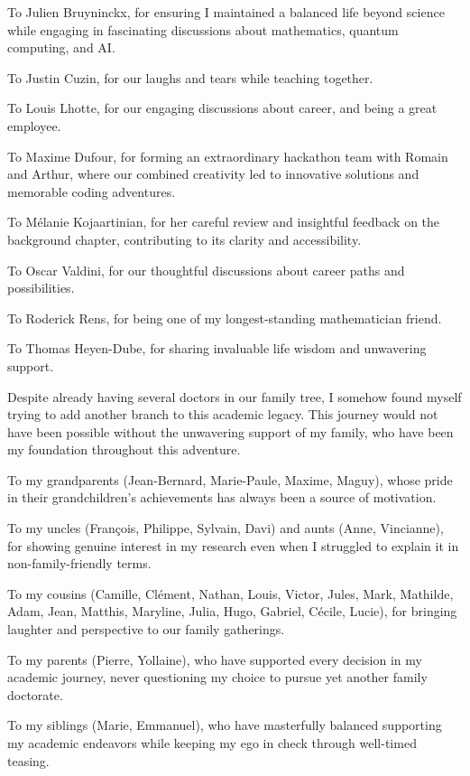 To Julien Bruyninckx, for ensuring I maintained a balanced life beyond science while engaging in fascinating discussions about mathematics, quantum computing, and AI.

To Justin Cuzin, for our laughs and tears while teaching together.

To Louis Lhotte, for our engaging discussions about career, and being a great employee.

To Maxime Dufour, for forming an extraordinary hackathon team with Romain and Arthur, where our combined creativity led to innovative solutions and memorable coding adventures.

To Mélanie Kojaartinian, for her careful review and insightful feedback on the background chapter, contributing to its clarity and accessibility.

To Oscar Valdini, for our thoughtful discussions about career paths and possibilities.

To Roderick Rens, for being one of my longest-standing mathematician friend.

To Thomas Heyen-Dube, for sharing invaluable life wisdom and unwavering support.



Despite already having several doctors in our family tree, I somehow found myself trying to add another branch to this academic legacy.
This journey would not have been possible without the unwavering support of my family, who have been my foundation throughout this adventure.

To my grandparents (Jean-Bernard, Marie-Paule, Maxime, Maguy), whose pride in their grandchildren's achievements has always been a source of motivation.

To my uncles (François, Philippe, Sylvain, Davi) and aunts (Anne, Vincianne), for showing genuine interest in my research even when I struggled to explain it in non-family-friendly terms.

To my cousins (Camille, Clément, Nathan, Louis, Victor, Jules, Mark, Mathilde, Adam, Jean, Matthis, Maryline, Julia, Hugo, Gabriel, Cécile, Lucie), for bringing laughter and perspective to our family gatherings.

To my parents (Pierre, Yollaine), who have supported every decision in my academic journey, never questioning my choice to pursue yet another family doctorate.

To my siblings (Marie, Emmanuel), who have masterfully balanced supporting my academic endeavors while keeping my ego in check through well-timed teasing.



